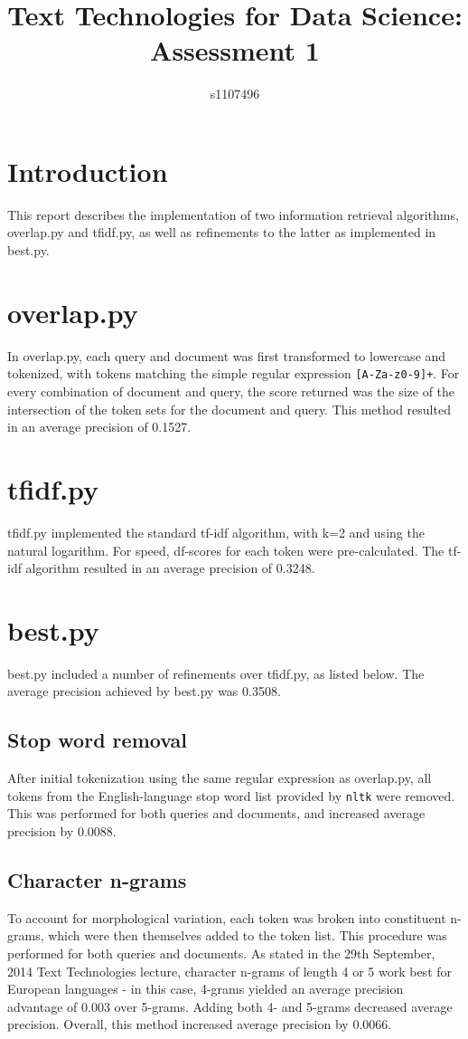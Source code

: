 \documentclass{article}
\begin{document}
\title{Text Technologies for Data Science: Assessment 1}
\author{s1107496}

\maketitle

\section{Introduction}
This report describes the implementation of two information retrieval algorithms, overlap.py and tfidf.py, as well as refinements to the latter as implemented in best.py.

\section{overlap.py}
In overlap.py, each query and document was first transformed to lowercase and tokenized, with tokens matching the simple regular expression \texttt{[A-Za-z0-9]+}. For every combination of document and query, the score returned was the size of the intersection of the token sets for the document and query. This method resulted in an average precision of 0.1527.

\section{tfidf.py}
tfidf.py implemented the standard tf-idf algorithm, with k=2 and using the natural logarithm. For speed, df-scores for each token were pre-calculated. The tf-idf algorithm resulted in an average precision of 0.3248.

\section{best.py}
best.py included a number of refinements over tfidf.py, as listed below. The average precision achieved by best.py was 0.3508.
\subsection{Stop word removal}
After initial tokenization using the same regular expression as overlap.py, all tokens from the English-language stop word list provided by \texttt{nltk} were removed. This was performed for both queries and documents, and increased average precision by 0.0088.
\subsection{Character n-grams}
To account for morphological variation, each token was broken into constituent n-grams, which were then themselves added to the token list. This procedure was performed for both queries and documents. As stated in the 29th September, 2014 Text Technologies lecture, character n-grams of length 4 or 5 work best for European languages - in this case, 4-grams yielded an average precision advantage of 0.003 over 5-grams. Adding both 4- and 5-grams decreased average precision. Overall, this method increased average precision by 0.0066.
\end{document}
